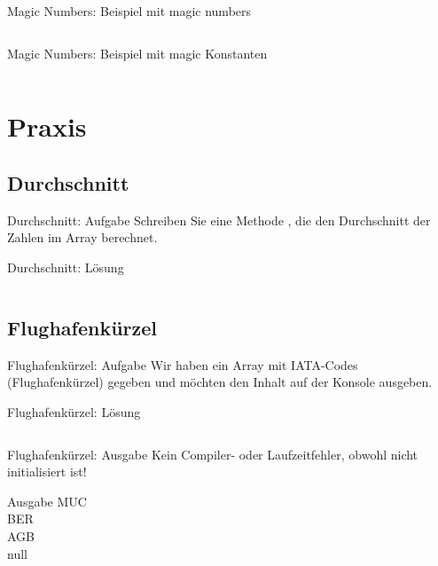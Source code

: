 \documentclass[usepdftitle=false,hyperref={pdfpagelabels=false}]{beamer}
\begin{document}
\begin{frame}{Magic Numbers: Beispiel mit magic numbers}
    \inputminted[linenos=true, numbersep=5pt, tabsize=4, fontsize=\tiny]{java}{ConnectFourGame-bad.java}
\end{frame}

\begin{frame}{Magic Numbers: Beispiel mit magic Konstanten}
    \inputminted[linenos=true, numbersep=5pt, tabsize=4, fontsize=\tiny]{java}{ConnectFourGame.java}
\end{frame}

\section{Praxis}
\subsection{Durchschnitt}
\begin{frame}{Durchschnitt: Aufgabe}
    Schreiben Sie eine Methode ,
    die den Durchschnitt der Zahlen im Array  berechnet.
\end{frame}

\begin{frame}{Durchschnitt: Lösung}
    \inputminted[linenos=true, numbersep=5pt, tabsize=4, fontsize=\small]{java}{AverageCalculation.java}
\end{frame}

\subsection{Flughafenkürzel}
\begin{frame}{Flughafenkürzel: Aufgabe}
    Wir haben ein Array mit IATA-Codes (Flughafenkürzel) gegeben und
    möchten den Inhalt auf der Konsole ausgeben.
\end{frame}

\begin{frame}{Flughafenkürzel: Lösung}
    \inputminted[linenos=true, numbersep=5pt, tabsize=4, fontsize=\small]{java}{IataCode.java}
\end{frame}

\begin{frame}{Flughafenkürzel: Ausgabe}
    Kein Compiler- oder Laufzeitfehler, obwohl 
    nicht initialisiert ist!

    \begin{block}{Ausgabe}
    MUC\\
    BER\\
    AGB\\
    null
    \end{block}
\end{frame}
\end{document}
